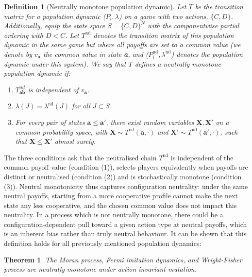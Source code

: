 \documentclass{article}
\newtheorem{theorem}{Theorem}
\newtheorem{definition}{Definition}
\begin{document}
\begin{definition}[Neutrally monotone population dynamic]
    Let \(T\) be the transition matrix for a population dynamic (\(P_i,
    \lambda\)) on a game with two actions, \(\{C, D\}\). Additionally, equip the
    state space \(S =\{C, D\}^N\) with the componentwise partial ordering with
    \(D < C\). Let \(T^{\mathrm{nd}}\) denotes the transition matrix of this
    population dynamic in the same game but where all payoffs are set to a
    common value (we denote by \(v_{\mathbf{a}}\) the common value in state
    \textbf{a}, and (\(P^{\mathrm{nd}}_i, \lambda^{\mathrm{nd}}\)) denotes the
    population dynamic under this system). We say that \(T\) defines a
    \emph{neutrally monotone} population dynamic if:
    
    \begin{enumerate}
    \item \(T_{\mathbf{ab}}^{nd}\) is independent of \(v_{\mathbf{a}}\).
    \item \(\lambda(J) = \lambda^{\mathrm{nd}}(J)\) for all \(J \subset S\).
    \item For every pair of states \(\mathbf{a} \leq \mathbf{a}'\), there exist random
        variables \(\mathbf{X}, \mathbf{X}'\) on a common probability space, with
        \(\mathbf{X} \sim T^{\mathrm{nd}}(\mathbf{a}, \cdot)\) and
        \(\mathbf{X}' \sim T^{\mathrm{nd}}(\mathbf{a}', \cdot)\), such that
        \(\mathbf{X} \leq \mathbf{X}'\) almost surely.
    \end{enumerate}
\end{definition}

The three conditions ask that the neutralised chain \(T^{\mathrm{nd}}\) is
independent of the common payoff value (condition (1)), selects players
equivalently when payoffs are distinct or neutralised (condition (2)) and is
stochastically monotone (condition (3)). Neutral monotonicity thus captures
configuration neutrality: under the same neutral payoffs, starting from a more
cooperative profile cannot make the next state any less cooperative, and the
chosen common value does not impact this neutrality. In a process which is not
neutrally monotone, there could be a configuration-dependent pull toward a given
action type at neutral payoffs, which is an inherent bias rather than truly
neutral behaviour. It can be shown that this definition holds for all previously
mentioned population dynamics:

\begin{theorem}
    The Moran process, Fermi imitation dynamics, and Wright-Fisher process are
    neutrally monotone under action-invariant mutation.
\end{theorem}
\end{document}
